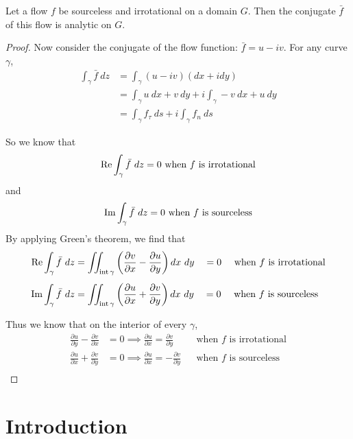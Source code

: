 \documentclass[letterpaper, twoside, 12 pt]{article}
\begin{document}
	\begin{theorem}
		Let a flow $f$ be sourceless and irrotational on a domain $G$.
		Then the conjugate $\bar f$ of this flow is analytic on $G$.
	\end{theorem}
	\begin{proof}
		Now consider the conjugate of the flow function: $\bar f = u - i v$.
		For any curve $\gamma$, 
		\begin{align*}
			\int_\gamma \bar f \ dz &= \int_\gamma (u - iv) (dx + i dy) \\
			&= \int_\gamma u\ dx + v\ dy + i \int_\gamma -v \ dx + u \ dy\\
			&= \int_\gamma f_\tau \ ds + i \int_\gamma f_n \ ds
		\end{align*}

		So we know that 
		\[
			\re \int_\gamma \bar f \ dz = 0 \text{ when $f$ is irrotational}
		\]
		and
		\[
			\operatorname*{Im} \int_\gamma \bar f \ dz = 0 \text{ when $f$ is sourceless}
		\]
		By applying Green's theorem, we find that 
		\begin{align*}
			\operatorname*{Re} \int_\gamma \bar f \ dz &= \iint_{\operatorname*{int} \gamma} \left( \frac{\partial v}{\partial x} - \frac{\partial u}{\partial y} \right) dx\ dy 
			\quad = 0 \quad \text{ when $f$ is irrotational}\\[1 ex]
			\operatorname*{Im} \int_\gamma \bar f \ dz &= \iint_{\operatorname*{int} \gamma} \left( \frac{\partial u}{\partial x} + \frac{\partial v}{\partial y} \right) dx\ dy 
			\quad = 0 \quad \text{ when $f$ is sourceless}
		\end{align*}

		Thus we know that on the interior of every $\gamma$, 
		\begin{align*}
			\frac{\partial u}{\partial y} - \frac{\partial v}{\partial x} &= 0 \implies \frac{\partial u}{\partial x} = \frac{\partial v}{\partial y} & &\text{when $f$ is irrotational} \\
			\frac{\partial u}{\partial x} + \frac{\partial v}{\partial y} &= 0 \implies \frac{\partial u}{\partial x} = - \frac{\partial v}{\partial y} & &\text{when $f$ is sourceless} \\
		\end{align*}
	\end{proof}
	

\clearpage
\section{Introduction} %
\label{sec:introduction}
\end{document}
